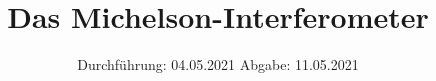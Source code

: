 

\subject{V401}
\title{Das Michelson-Interferometer}
\date{%
  Durchführung: 04.05.2021
  \hspace{3em}
  Abgabe: 11.05.2021
}



\maketitle
\thispagestyle{empty}
\tableofcontents
\newpage






\printbibliography{}


